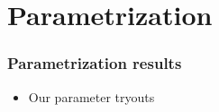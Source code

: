\section{Parametrization}

\begin{frame}
	\frametitle{Parametrization results}
	\begin{itemize}
		\item Our parameter tryouts
	\end{itemize}
\end{frame}